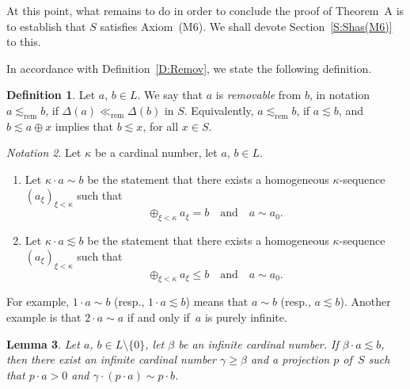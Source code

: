 \documentclass[psamsfonts,reqno]{memo-l}
\theoremstyle{plain}
\newtheorem{lemma}{Lemma}[section]
\theoremstyle{definition}
\newtheorem{definition}[lemma]{Definition}
\theoremstyle{remark}
\newtheorem{notation}[lemma]{Notation}
\numberwithin{equation}{section}
\renewcommand{\iff}{if and only if}
\newcommand{\rem}{\ll_{\mathrm{rem}}}
\newcommand{\srem}{\lesssim_{\mathrm{rem}}}
\newcommand{\DD}{\Delta}
\newcommand{\set}[1]{\{#1\}}
\newcommand{\famm}[2]{(#1)_{#2}}
\begin{document}
At this point, what remains to do in order to conclude the proof of
Theorem~A is to establish that $S$ satisfies Axiom~(M6). We shall devote
Section~\ref{S:Shas(M6)} to this.

In accordance with Definition~\ref{D:Remov}, we state the following
definition.

\begin{definition}\label{D:RemovL}
Let $a$, $b\in L$. We say that $a$ is \emph{removable} from $b$,
 in notation
$a\srem b$\index{abrszzem@$a\srem b$|ii}, if $\DD(a)\rem\DD(b)$ in $S$.
Equivalently, $a\srem b$, if
$a\lesssim b$, and $b\lesssim a\oplus x$ implies that $b\lesssim x$, for all
$x\in S$.
\end{definition}

\begin{notation}\label{Not:CardElt}
Let $\kappa$ be a cardinal number, let $a$, $b\in L$.
\begin{enumerate}
\item Let $\kappa\cdot a\sim b$ be the statement that there exists a
homogeneous $\kappa$-sequence $\famm{a_\xi}{\xi<\kappa}$ such that
   \[
   \oplus_{\xi<\kappa}a_\xi=b\quad\text{and}\quad a\sim a_0.
   \]
\item Let $\kappa\cdot a\lesssim b$ be the statement that there exists a
homogeneous $\kappa$-sequence $\famm{a_\xi}{\xi<\kappa}$ such that
   \[
   \oplus_{\xi<\kappa}a_\xi\leq b\quad\text{and}\quad a\sim a_0.
   \]
\end{enumerate}
\end{notation}

For example, $1\cdot a\sim b$ (resp., $1\cdot a\lesssim b$) means that
$a\sim b$ (resp., $a\lesssim b$). Another example is that $2\cdot a\sim a$
\iff\ $a$ is purely infinite.

\begin{lemma}\label{L:LocInfQuot}
Let $a$, $b\in L\setminus\set{0}$, let $\beta$ be an infinite cardinal number.
If $\beta\cdot a\lesssim b$, then there exist an infinite
cardinal number $\gamma\geq\beta$ and a projection $p$ of~$S$ such
that $p\cdot a>0$ and $\gamma\cdot(p\cdot a)\sim p\cdot b$.
\end{lemma}
\end{document}
